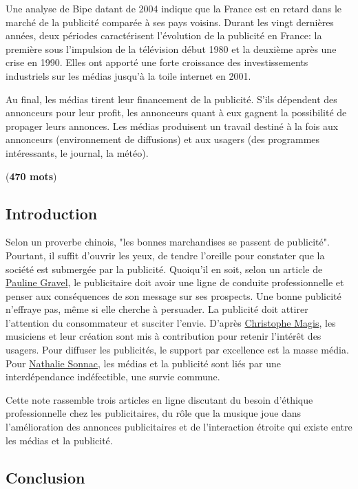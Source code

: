 \documentclass[11pt]{article}
\begin{document}
Une analyse de Bipe datant de 2004 indique que la France est en retard dans le marché de la publicité comparée à ses pays voisins. Durant les vingt dernières années, deux périodes caractérisent l'évolution de la publicité en France: la première sous l'impulsion de la télévision début 1980 et la deuxième après une crise en 1990. Elles ont apporté une forte croissance des investissements industriels sur les médias jusqu'à la toile internet en 2001.

Au final, les médias tirent leur financement de la publicité. S'ils dépendent des annonceurs pour leur profit, les annonceurs quant à eux gagnent la possibilité de propager leurs annonces. Les médias produisent un travail destiné à la fois aux annonceurs (environnement de diffusions) et aux usagers (des programmes intéressants, le journal, la météo).

(\textbf{470 mots})

\newpage
\subsection{Introduction}

Selon un proverbe chinois, "les bonnes marchandises se passent de publicité". Pourtant, il suffit d'ouvrir les yeux, de tendre l'oreille pour constater que la société est submergée par la publicité. Quoiqu'il en soit, selon un article de \underline{Pauline Gravel}, le publicitaire doit avoir une ligne de conduite professionnelle et penser aux conséquences de son message sur ses prospects. Une bonne publicité n'effraye pas, même si elle cherche à persuader. La publicité doit attirer l'attention du consommateur et susciter l'envie. D'après \underline{Christophe Magis}, les musiciens et leur création sont mis à contribution pour retenir l'intérêt des usagers. Pour diffuser les publicités, le support par excellence est la masse média. Pour \underline{Nathalie Sonnac}, les médias et la publicité sont liés par une interdépendance indéfectible, une survie commune.

Cette note rassemble trois articles en ligne discutant du besoin d'éthique professionnelle chez les publicitaires, du rôle que la musique joue dans l'amélioration des annonces publicitaires et de l'interaction étroite qui existe entre les médias et la publicité.

\subsection{Conclusion}
\end{document}
